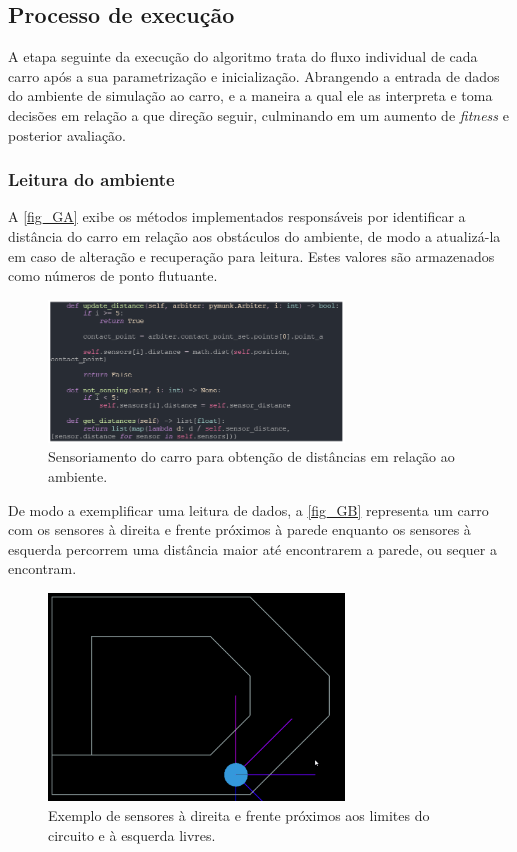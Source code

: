 \subsection{Processo de execução}
A etapa seguinte da execução do algoritmo trata do fluxo individual de cada carro após a sua parametrização e inicialização.
Abrangendo a entrada de dados do ambiente de simulação ao carro, e a maneira a qual ele as interpreta e toma decisões em relação a que direção seguir,
culminando em um aumento de \textit{fitness} e posterior avaliação.

\subsubsection{Leitura do ambiente}
A \autoref{fig_GA} exibe os métodos implementados responsáveis por identificar a distância do carro em relação
aos obstáculos do ambiente, de modo a atualizá-la em caso de alteração e recuperação para leitura. Estes valores
são armazenados como números de ponto flutuante.

\begin{figure}[htb]
        \centering
        \caption{\label{fig_GA}Sensoriamento do carro para obtenção de distâncias em relação ao ambiente.}
        \includegraphics[width=0.7\textwidth]{images/GA.png}
\end{figure}

De modo a exemplificar uma leitura de dados, a \autoref{fig_GB} representa um carro com os sensores à direita
e frente próximos à parede enquanto os sensores à esquerda percorrem uma distância maior até encontrarem a parede,
ou sequer a encontram.

\begin{figure}[htb]
        \centering
        \caption{\label{fig_GB}Exemplo de sensores à direita e frente próximos aos limites do circuito e à esquerda livres.}
        \includegraphics[width=0.7\textwidth]{images/GB.png}
\end{figure}

